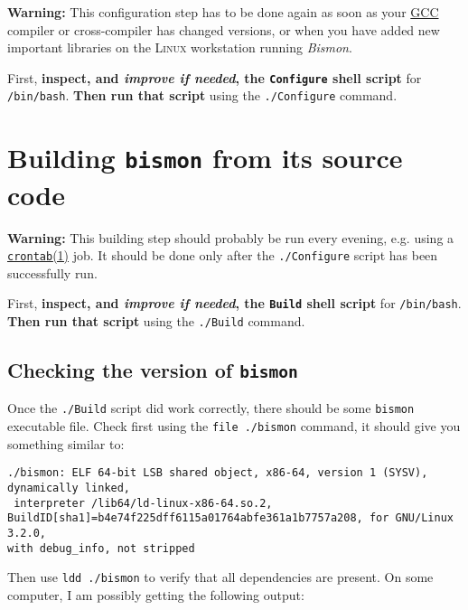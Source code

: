 \begin{appendices}
\textbf{\large Warning:} This configuration step has to be done again as soon
as your \href{http://gcc.gnu.org/}{GCC} compiler or cross-compiler has
changed versions, or when you have added new important libraries on
the \textsc{Linux} workstation running \emph{Bismon}.

First, \textbf{inspect, and \emph{improve if needed}, the \texttt{Configure} shell
script} for \texttt{/bin/bash}. \textbf{Then run that script} using the
\texttt{./Configure} command.

\section{Building \texttt{bismon} from its source code}
\label{sec:building-bismon}

\textbf{\large Warning:} This building step should probably be run
every evening, e.g. using a
\href{https://man7.org/linux/man-pages/man1/crontab.1.html}{\texttt{crontab}(1)}
job. It should be done only after the \texttt{./Configure} script has
been successfully run.

First, \textbf{inspect, and \emph{improve if needed}, the \texttt{Build} shell
script} for \texttt{/bin/bash}. \textbf{Then run that script} using the
\texttt{./Build} command. 


\subsection{Checking the version of \texttt{bismon}}

Once the \texttt{./Build} script did work correctly, there should be
some \texttt{bismon} executable file. Check first using the
\texttt{file ./bismon} command, it should give you something similar
to:

\begin{verbatim}
./bismon: ELF 64-bit LSB shared object, x86-64, version 1 (SYSV), dynamically linked,
 interpreter /lib64/ld-linux-x86-64.so.2,
BuildID[sha1]=b4e74f225dff6115a01764abfe361a1b7757a208, for GNU/Linux 3.2.0,
with debug_info, not stripped
\end{verbatim}

Then use \texttt{ldd ./bismon} to verify that all dependencies are
present. On some computer, I am possibly getting the following output:


\end{appendices}

